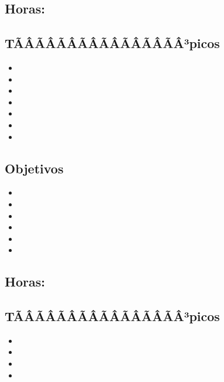 \subsection{\ARCINCODef}\label{sec:BOK-AR5}
\subsection*{Horas: \ARCINCOHours}

\subsection*{TÃÂÃÂÃÂÃÂÃÂÃÂÃÂÃÂ³picos}
\begin{itemize}
	\item \ARCINCOTopicFundamentos
	\item \ARCINCOTopicEstructuras
	\item \ARCINCOTopicAlmacenamiento
	\item \ARCINCOTopicBuses
	\item \ARCINCOTopicIntroduccion
	\item \ARCINCOTopicSoporte
	\item \ARCINCOTopicArquitecturas
\end{itemize}

\subsection*{Objetivos}
\begin{itemize}
	\item \ARCINCOObjUNO
	\item \ARCINCOObjDOS
	\item \ARCINCOObjTRES
	\item \ARCINCOObjCUATRO
	\item \ARCINCOObjCINCO
	\item \ARCINCOObjSEIS
\end{itemize}

\subsection{\ARSEISDef}\label{sec:BOK-AR6}
\subsection*{Horas: \ARSEISHours}

\subsection*{TÃÂÃÂÃÂÃÂÃÂÃÂÃÂÃÂ³picos}
\begin{itemize}
	\item \ARSEISTopicImplementacion
	\item \ARSEISTopicUnidad
	\item \ARSEISTopicInstruccion
	\item \ARSEISTopicIntroduccion
\end{itemize}

